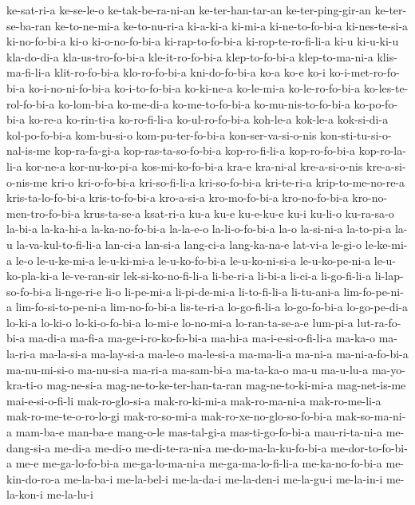 {ke-sat-ri-a ke-se-le-o ke-tak-be-ra-ni-an ke-ter-han-tar-an
ke-ter-ping-gir-an ke-ter-se-ba-ran ke-to-ne-mi-a ke-to-nu-ri-a ki-a-ki-a
ki-mi-a ki-ne-to-fo-bi-a ki-nes-te-si-a ki-no-fo-bi-a ki-o ki-o-no-fo-bi-a
ki-rap-to-fo-bi-a ki-rop-te-ro-fi-li-a ki-u ki-u-ki-u kla-do-di-a
kla-us-tro-fo-bi-a kle-it-ro-fo-bi-a klep-to-fo-bi-a klep-to-ma-ni-a
klis-ma-fi-li-a klit-ro-fo-bi-a klo-ro-fo-bi-a kni-do-fo-bi-a ko-a ko-e
ko-i ko-i-met-ro-fo-bi-a ko-i-no-ni-fo-bi-a ko-i-to-fo-bi-a ko-ki-ne-a
ko-le-mi-a ko-le-ro-fo-bi-a ko-les-te-rol-fo-bi-a ko-lom-bi-a ko-me-di-a
ko-me-to-fo-bi-a ko-mu-nis-to-fo-bi-a ko-po-fo-bi-a ko-re-a ko-rin-ti-a
ko-ro-fi-li-a ko-ul-ro-fo-bi-a koh-le-a kok-le-a kok-si-di-a
kol-po-fo-bi-a kom-bu-si-o kom-pu-ter-fo-bi-a kon-ser-va-si-o-nis
kon-sti-tu-si-o-nal-is-me kop-ra-fa-gi-a kop-ras-ta-so-fo-bi-a
kop-ro-fi-li-a kop-ro-fo-bi-a kop-ro-la-li-a kor-ne-a kor-nu-ko-pi-a
kos-mi-ko-fo-bi-a kra-e kra-ni-al kre-a-si-o-nis kre-a-si-o-nis-me kri-o
kri-o-fo-bi-a kri-so-fi-li-a kri-so-fo-bi-a kri-te-ri-a krip-to-me-no-re-a
kris-ta-lo-fo-bi-a kris-to-fo-bi-a kro-a-si-a kro-mo-fo-bi-a
kro-no-fo-bi-a kro-no-men-tro-fo-bi-a krus-ta-se-a ksat-ri-a ku-a ku-e
ku-e-ku-e ku-i ku-li-o ku-ra-sa-o la-bi-a la-ka-hi-a la-ka-no-fo-bi-a
la-la-e-o la-li-o-fo-bi-a la-o la-si-ni-a la-to-pi-a la-u
la-va-kul-to-fi-li-a lan-ci-a lan-si-a lang-ci-a lang-ka-na-e lat-vi-a
le-gi-o le-ke-mi-a le-o le-u-ke-mi-a le-u-ki-mi-a le-u-ko-fo-bi-a
le-u-ko-ni-si-a le-u-ko-pe-ni-a le-u-ko-pla-ki-a le-ve-ran-sir
lek-si-ko-no-fi-li-a li-be-ri-a li-bi-a li-ci-a li-go-fi-li-a
li-lap-so-fo-bi-a li-nge-ri-e li-o li-pe-mi-a li-pi-de-mi-a li-to-fi-li-a
li-tu-ani-a lim-fo-pe-ni-a lim-fo-si-to-pe-ni-a lim-no-fo-bi-a lis-te-ri-a
lo-go-fi-li-a lo-go-fo-bi-a lo-go-pe-di-a lo-ki-a lo-ki-o lo-ki-o-fo-bi-a
lo-mi-e lo-no-mi-a lo-ran-ta-se-a-e lum-pi-a lut-ra-fo-bi-a ma-di-a
ma-fi-a ma-ge-i-ro-ko-fo-bi-a ma-hi-a ma-i-e-si-o-fi-li-a ma-ka-o
ma-la-ri-a ma-la-si-a ma-lay-si-a ma-le-o ma-le-si-a ma-ma-li-a ma-ni-a
ma-ni-a-fo-bi-a ma-nu-mi-si-o ma-nu-si-a ma-ri-a ma-sam-bi-a ma-ta-ka-o
ma-u ma-u-lu-a ma-yo-kra-ti-o mag-ne-si-a mag-ne-to-ke-ter-han-ta-ran
mag-ne-to-ki-mi-a mag-net-is-me mai-e-si-o-fi-li mak-ro-glo-si-a
mak-ro-ki-mi-a mak-ro-ma-ni-a mak-ro-me-li-a mak-ro-me-te-o-ro-lo-gi
mak-ro-so-mi-a mak-ro-xe-no-glo-so-fo-bi-a mak-so-ma-ni-a mam-ba-e
man-ba-e mang-o-le mas-tal-gi-a mas-ti-go-fo-bi-a mau-ri-ta-ni-a
me-dang-si-a me-di-a me-di-o me-di-te-ra-ni-a me-do-ma-la-ku-fo-bi-a
me-dor-to-fo-bi-a me-e me-ga-lo-fo-bi-a me-ga-lo-ma-ni-a
me-ga-ma-lo-fi-li-a me-ka-no-fo-bi-a me-kin-do-ro-a me-la-ba-i me-la-bel-i
me-la-da-i me-la-den-i me-la-gu-i me-la-in-i me-la-kon-i me-la-lu-i
}
